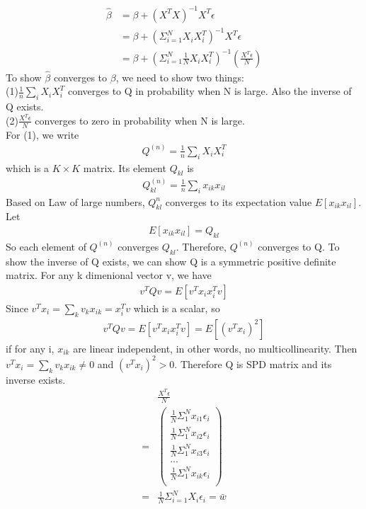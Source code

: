 \documentclass[a4paper]{article}
\begin{document}
\begin{align*}
\hat \beta &= \beta + ({X^TX})^{-1} {X^T \epsilon} \\
               &= \beta + ( \Sigma_{i=1}^N X_i X_i^T)^{-1} X^T \epsilon \\
               &= \beta + ( \Sigma_{i=1}^N  \frac{1}{N}{X_iX_i^T})^{-1}(\frac{X^T \epsilon}{N})
\end{align*}
To show $\hat \beta$ converges to $\beta$, we need to show two things:\\
(1)$\frac{1}{n}\sum_i{X_iX_i^T}$  converges to Q in probability when N is large. Also the inverse of Q exists.\\
(2)$\frac{X^T \epsilon}{N}$ converges to zero in probability when N is large.\\
For (1), we write
\begin{align*}
Q^{(n)} = \frac{1}{n}\sum_i{X_iX_i^T}
\end{align*}
which is a $K \times K$ matrix. Its element $Q_{kl}$ is
\begin{align*}
Q^{(n)}_{kl} = \frac{1}{n} \sum_i x_{ik} x_{il}
\end{align*}
Based on Law of large numbers, $Q^{n}_{kl}$ converges to its expectation value $E[x_{ik}x_{il}]$. Let
\begin{align*}
E[x_{ik}x_{il}]=Q_{kl}
\end{align*}
So each element of $Q^{(n)}$ converges $Q_{kl}$. Therefore, $Q^{(n)}$ converges to Q. To show the inverse of Q exists, we can show Q is a symmetric positive definite matrix. For any k dimenional vector v, we have
\begin{align*}
v^TQv = E[v^T x_i x_i^T v]
\end{align*}
Since $v^T x_i = \sum_k v_k x_{ik} = x_i^T v$ which is a scalar, so
\begin{align*}
v^TQv = E[v^T x_i x_i^T v] = E[(v^T x_i)^2]
\end{align*} 
if for any i, $x_{ik}$ are linear independent, in other words, no multicollinearity. Then $v^T x_{i} =\sum_k v_k x_{ik} \neq 0$ and $(v^T x_i)^2>0$. Therefore Q is SPD matrix and its inverse exists.
\begin{align*}
&\frac{X^T \epsilon}{N}\\ 
 =& \left(\begin{array} {c}
       \frac{1}{N}\Sigma_{1}^{N}x_{i1}\epsilon_i \\
       \frac{1}{N}\Sigma_{1}^{N}x_{i2}\epsilon_i \\
       \frac{1}{N}\Sigma_{1}^{N}x_{i3}\epsilon_i \\
       ... \\ 
      \frac{1}{N}\Sigma_{1}^{N}x_{ik}\epsilon_i\\
     \end{array} \right)\\
=& \frac{1}{N}\Sigma_{i=1}^{N} X_i\epsilon_i = \bar w\\
\end{align*}
\end{document}
